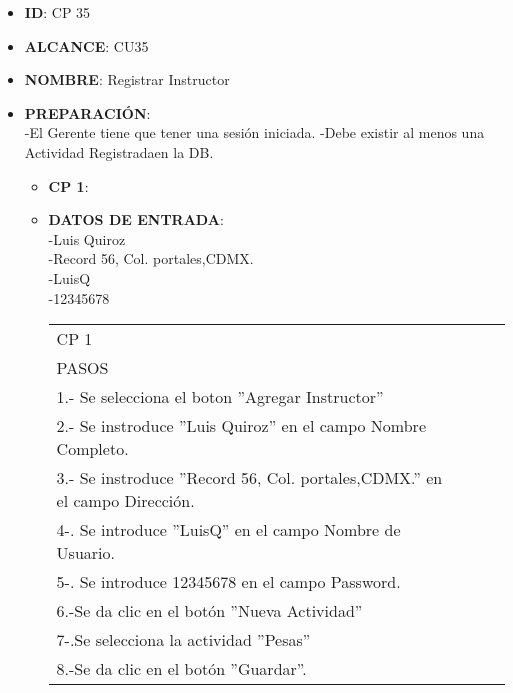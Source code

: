 
% 


\begin{itemize}
\item \textbf{ID}: CP 35
\item \textbf{ALCANCE}: CU35
\item \textbf{NOMBRE}: Registrar Instructor
\item \textbf{PREPARACIÓN}:\\
		-El Gerente tiene que tener una sesión iniciada.
		-Debe existir al menos una Actividad Registradaen la DB.
\begin{itemize}
\item \textbf{CP 1}:
\item \textbf{DATOS DE ENTRADA}:\\
-Luis Quiroz\\
-Record 56, Col. portales,CDMX.\\
-LuisQ\\
-12345678\\
	\begin{center}			
	\begin{tabular}{||l|l|l|l||}
		\hline
		\hline
			CP 1\\
			PASOS\\
			\hline 1.- Se selecciona el boton ''Agregar Instructor''\\
			\hline 2.- Se instroduce ''Luis Quiroz'' en el campo  Nombre Completo.\\
			\hline 3.- Se instroduce ''Record 56, Col. portales,CDMX.'' en el campo  Dirección.\\
			\hline 4-. Se introduce  ''LuisQ'' en el campo Nombre de Usuario.\\
			\hline 5-. Se introduce  12345678  en el campo Password.\\
            \hline 6.-Se da clic en el botón ''Nueva Actividad''\\
            \hline 7-.Se selecciona la actividad ''Pesas''\\
            \hline 8.-Se da clic en el botón ''Guardar''.\\
        \hline
		\hline
	\end{tabular}
	\end{center}

\end{itemize}
\end{itemize}
